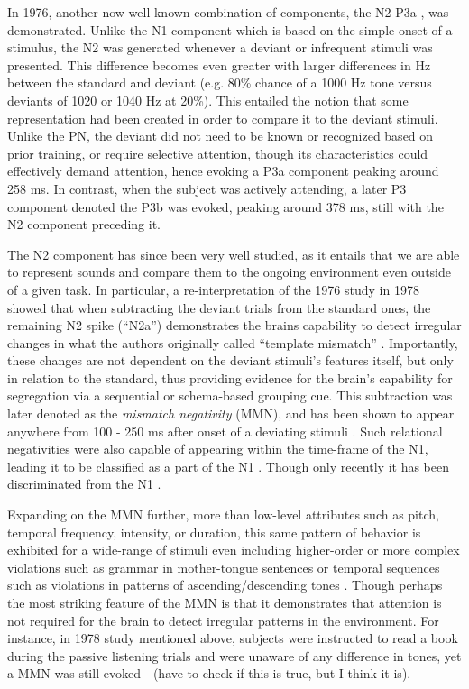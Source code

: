 In 1976, another now well-known combination of components, the N2-P3a \cite{Snyder1976}, was demonstrated.  Unlike the N1 component which is based on the simple onset of a stimulus, the N2 was generated whenever a deviant or infrequent stimuli was presented.  This difference becomes even greater with larger differences in Hz between the standard and deviant (e.g. 80\% chance of a 1000 Hz tone versus deviants of 1020 or 1040 Hz at 20\%).  This entailed the notion that some representation had been created in order to compare it to the deviant stimuli.  Unlike the PN, the deviant did not need to be known or recognized based on prior training, or require selective attention, though its characteristics could effectively demand attention, hence evoking a P3a component peaking around 258 ms.  In contrast, when the subject was actively attending, a later P3 component denoted the P3b was evoked, peaking around 378 ms, still with the N2 component preceding it. 

The N2 component has since been very well studied, as it entails that we are able to represent sounds and compare them to the ongoing environment even outside of a given task.  In particular, a re-interpretation of the 1976 study in 1978 showed that when subtracting the deviant trials from the standard ones, the remaining N2 spike (``N2a'') demonstrates the brains capability to detect irregular changes in what the authors originally called ``template mismatch'' \cite{Naatanen1978}.  Importantly, these changes are not dependent on the deviant stimuli's features itself, but only in relation to the standard, thus providing evidence for the brain's capability for segregation via a sequential or schema-based grouping cue.  This subtraction was later denoted as the \textit{mismatch negativity} (MMN), and has been shown to appear anywhere from 100 - 250 ms after onset of a deviating stimuli \cite{Naatanen1978,Naatanen1987,Naatanen2007,Campbell2007,Garrido2009,Naatanen2011}.  Such relational negativities were also capable of appearing within the time-frame of the N1, leading it to be classified as a part of the N1 \cite{Naatanen1987}.  Though only recently it has been discriminated from the N1 \cite{Campbell2007}.  

Expanding on the MMN further, more than low-level attributes such as pitch, temporal frequency, intensity, or duration, this same pattern of behavior is exhibited for a wide-range of stimuli even including higher-order or more complex violations such as grammar in mother-tongue sentences \cite{} or temporal sequences such as violations in patterns of ascending/descending tones \cite{}.   Though perhaps the most striking feature of the MMN is that it demonstrates that attention is not required for the brain to detect irregular patterns in the environment.  For instance, in 1978 study mentioned above, subjects were instructed to read a book during the passive listening trials and were unaware of any difference in tones, yet a MMN was still evoked \cite{} - (have to check if this is true, but I think it is).


